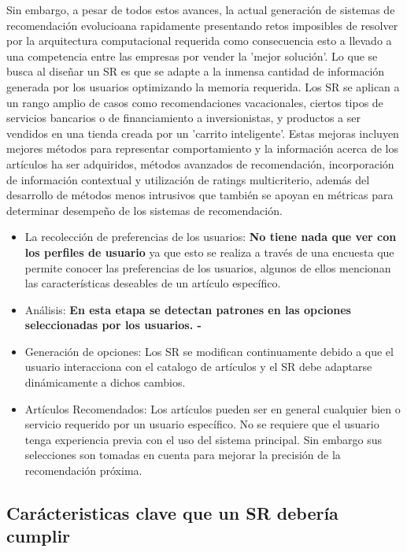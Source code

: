 Sin embargo, a pesar de todos estos avances, la actual generación de
sistemas de recomendación evolucioana rapidamente presentando retos imposibles de resolver por la arquitectura computacional requerida como consecuencia esto a llevado a una competencia entre las empresas por vender la 'mejor solución'. Lo que se busca al diseñar un SR es que se adapte a la inmensa cantidad de información generada por los usuarios optimizando la memoria requerida. Los SR se aplican a un rango amplio de casos como
recomendaciones vacacionales, ciertos tipos de servicios bancarios o de
financiamiento a inversionistas, y productos a ser vendidos en una
tienda creada por un 'carrito inteligente'. Estas mejoras
incluyen mejores métodos para representar comportamiento y la
información acerca de los artículos ha ser adquiridos, métodos avanzados
de recomendación, incorporación de información contextual y utilización
de ratings multicriterio, además del desarrollo de métodos menos
intrusivos que también se apoyan en métricas para determinar desempeño
de los sistemas de recomendación.

\begin{itemize}

\item La recolección de preferencias de los usuarios: \textbf{ No
tiene nada que ver con los perfiles de usuario} ya que esto se realiza a
través de una encuesta que permite conocer las preferencias de los
usuarios, algunos de ellos mencionan las características deseables de un
artículo específico.

\item Análisis: \textbf{ En esta etapa se detectan
patrones en las opciones seleccionadas por los usuarios. - }
\item Generación de opciones:  Los SR se modifican continuamente debido a que el
usuario interacciona con el catalogo de artículos y el SR debe adaptarse
dinámicamente a dichos cambios.

\item Artículos Recomendados: Los
artículos pueden ser en general cualquier bien o servicio requerido por
un usuario específico. No se requiere que el usuario tenga experiencia
previa con el uso del sistema principal. Sin embargo sus selecciones son
tomadas en cuenta para mejorar la precisión de la recomendación próxima.

\end{itemize}

\subsection{Carácteristicas clave que un  SR debería cumplir}

